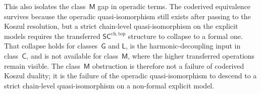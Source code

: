 \begin{remark}
This also isolates the class~$\mathsf{M}$ gap in operadic terms. The
coderived equivalence survives because the operadic quasi-isomorphism
still exists after passing to the Koszul resolution, but a strict
chain-level quasi-isomorphism on the explicit models requires the
transferred $\mathsf{SC}^{\mathrm{ch,top}}$ structure to collapse to a
formal one. That collapse holds for classes~$\mathsf{G}$ and
$\mathsf{L}$, is the harmonic-decoupling input in class~$\mathsf{C}$,
and is not available for class~$\mathsf{M}$, where the
higher transferred operations remain visible. The class~$\mathsf{M}$
obstruction is therefore not a failure of coderived Koszul duality; it
is the failure of the operadic quasi-isomorphism to descend to a
strict chain-level quasi-isomorphism on a non-formal explicit model.
\end{remark}

